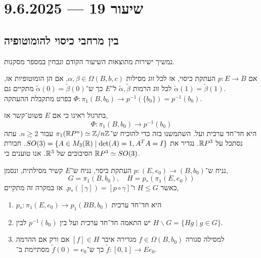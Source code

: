 \section{שיעור 19 --- 9.6.2025}

\subsection{בין מרחבי כיסוי להומוטופיה}
נמשיך ישירות מתוצאות השיעור הקודם ונבחין במספר מסקנות.
\begin{corollary}
	אם $p : E \to B$ העתקת כיסוי,
	אז לכל זוג מסילות $\alpha, \beta \in \Omega(B, b, c)$, אם הן הומוטופיות אז,
	לכל זוג הרמות $\tilde{\alpha}, \tilde{\beta}$ ל־$E$ כך ש־$\tilde{\alpha}(0) = \tilde{\beta}(0)$ מתקיים גם $\tilde{\alpha}(1) = \tilde{\beta}(1)$. \\
	בפרט מתקבלת ההעתקה $\Phi : \pi_1(B, b_0) \to p^{-1}(\{ b_0 \}) = p^{-1}(b_0)$.
\end{corollary}
בתרגול ראינו כי אם $E$ פשוט־קשר אז,
\[
	\Phi : \pi_1(B, b_0) \to p^{-1}(b_0)
\]
היא חד־חד ערכית ועל.
השתמשנו בזה כדי להוכיח ש־$\pi_1(\mathbb{R} P^n) \simeq \mathbb{Z} / n\mathbb{Z}$ עבור $n \ge 2$.
עתה נסתכל על $\mathbb{R} P^3$.
נגדיר את $SO(3) = \{ A \in M_3(\mathbb{R}) \mid \det(A) = 1, A^T A = I \}$.
חבורת הסיבובים של $\mathbb{R}^3$.
אנו טוענים כי $\mathbb{R} P^3 \simeq SO(3)$.
\begin{theorem}
	נניח ש־$p : (E, e_0) \to (B, b_0)$ העתקת כיסוי, נניח ש־$E$ קשיר מסילתית,
	ונסמן,
	\[
		G = \pi_1(B, b_0),
		\quad
		H = p_*(\pi_1(E, e_0))
	\]
	כאשר $H \le G$ ו־$p_*([\gamma]) = [ p \circ \gamma ]$.
	אז במקרה זה מתקיים,
	\begin{enumerate}
		\item $p_* : \pi_1(E, e_0) \to p_1(BB, b_0)$ היא חד־חד ערכית
		\item יש התאמה חד־חד ערכית ועל בין $p^{-1}(b_0)$ לבין $H \backslash G = \{ H g \mid g \in G \}$.
		\item למסילה סגורה $f \in \Omega(B, b_0)$ מגדירה איבר $[f] \in H$ אם ורק אם ההרמה $\tilde{f} : [0, 1] \to E$ כך ש־$\tilde{f}(0) = e_0$ מסתיימת ב־$e_0$.
	\end{enumerate}
\end{theorem}
